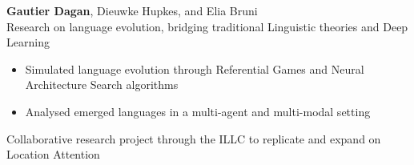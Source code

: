 



\textbf{Gautier Dagan}, Dieuwke  Hupkes, and Elia Bruni
\\
Research on language evolution, bridging traditional Linguistic theories and Deep Learning
\begin{itemize}
    \item Simulated language evolution through Referential Games and Neural Architecture Search algorithms
    \item Analysed emerged languages in a multi-agent and multi-modal setting
\end{itemize}{}


Collaborative research project through the ILLC to replicate and expand on Location Attention


